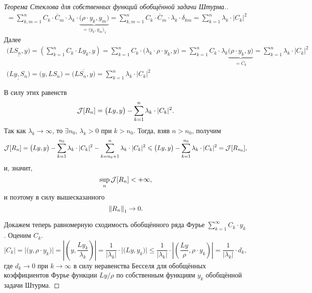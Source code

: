 \begin{proof}[Теорема Стеклова для собственных функций обобщённой задачи Штурма.]
\begin{multline*}
		=\sum\limits_{k,m=1}^n C_k\cdot\overline{C}_m\cdot\lambda_k\cdot\underbrace{\big(\rho\cdot y_k,y_m\big)}_{\textstyle=\big(y_k,y_m\big)_1}=\sum\limits_{k,m=1}^n C_k\cdot\overline{C}_m\cdot\lambda_k\cdot\delta_{km}=\sum\limits_{k=1}^n\lambda_k\cdot|C_k|^2
	\end{multline*}
	Далее
	\begin{gather*}
		\underline{\big(LS_n,y\big)}=\left(\sum\limits_{k=1}^n C_k\cdot Ly_k,y\right)=\sum\limits_{k=1}^nC_k\cdot\big(\lambda_k\cdot\rho\cdot y_k,y\big)=\sum\limits_{k=1}^n C_k\cdot\lambda_k\underbrace{\big(\rho\cdot y_k,y\big)}_{\textstyle=\overline{C}_k}=\sum\limits_{k=1}^n\lambda_k\cdot|C_k|^2\\
		\underline{\big(Ly,S_n\big)}=\big(y,LS_n\big)=\overline{\big(LS_n,y\big)}=\sum\limits_{k=1}^n\lambda_k\cdot|C_k|^2
	\end{gather*}
	
	В силу этих равенств
	\begin{equation*}
		\hfill\J[R_n]=\big(Ly,y\big)-\sum\limits_{k=1}^n\lambda_k\cdot|C_k|^2.\hfill
	\end{equation*}
	Так как $\lambda_k\to\infty$, то $\exists n_0$, $\lambda_k>0$ при $k>n_0$. Тогда, взяв $n>n_0$, получим 
	\begin{equation*}
		\hfill\J[R_n]=\big(Ly,y\big)-\sum\limits_{k=1}^{n_0}\lambda_k\cdot|C_k|^2-\sum\limits_{k=n_0+1}^n\lambda_k\cdot|C_k|^2\leqslant\big(Ly,y\big)-\sum\limits_{k=1}^{n_0}\lambda_k\cdot|C_k|^2=\J[R_{n_0}],\hfill
	\end{equation*}
	и, значит, 
	\begin{equation*}
		\hfill\sup\limits_{n}\J[R_n]<+\infty,\hfill
	\end{equation*}
	и поэтому в силу вышесказанного 
	\begin{equation*}
		\hfill\norm{R_n}_1\to0.\hfill
	\end{equation*}
	
	Докажем теперь равномерную сходимость обобщённого ряда Фурье $\displaystyle\sum\limits_{k=1}^{\infty}C_k\cdot y_k$. Оценим $C_k$.
	\begin{equation*}
		|C_k|=\big|\big(y,\rho\cdot y_k\big)\big|=\left|\left(y,\frac{Ly_k}{\lambda_k}\right)\right|=\frac1{|\lambda_k|}\cdot\big|\big(Ly,y_k\big)\big|\leqslant\frac1{|\lambda_k|}\cdot\left|\left(\frac{Ly}{\rho},\rho\cdot y_k\right)\right|=\frac1{|\lambda_k|}\cdot d_k,
	\end{equation*} 
	где $d_k\to0$ при $k\to\infty$ в силу неравенства Бесселя для обобщённых коэффициентов Фурье функции $Ly/\rho$ по собственным функциям $y_k$ обобщённой задачи Штурма.
	

\end{proof}
